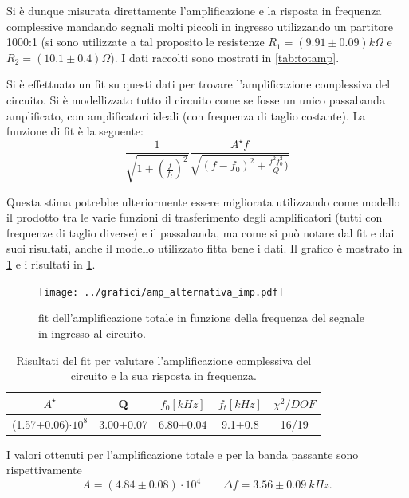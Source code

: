 \documentclass[a4paper,10pt]{article}
\begin{document}
Si è dunque misurata direttamente l'amplificazione e la risposta in frequenza  complessive mandando segnali molti piccoli in ingresso utilizzando un partitore 1000:1 (si sono utilizzate a tal proposito le resistenze $R_1 = (9.91\pm0.09) k\Omega $ e $R_2 = (10.1\pm0.4) \Omega$).
I dati raccolti sono mostrati in \cref{tab:totamp}.

Si è effettuato un fit su questi dati per trovare l'amplificazione complessiva del circuito. Si è modellizzato tutto il circuito come se fosse un unico passabanda amplificato, con amplificatori ideali (con frequenza di taglio costante). La funzione di fit è la seguente:
\begin{equation}
\label{eq:fittot}
\frac{1}{\sqrt{1+(\frac{f}{f_t})^2}} \frac{A^\star f}{\sqrt{(f - f_0)^2+ \frac{f^2 f_0^2}{Q} )}}
\end{equation}

Questa stima potrebbe ulteriormente essere migliorata utilizzando come modello il prodotto tra le varie funzioni di trasferimento degli amplificatori (tutti con frequenze di taglio diverse) e il passabanda, ma come si può notare dal fit e dai suoi risultati, anche il modello utilizzato fitta bene i dati. Il grafico è mostrato in \cref{fig:ampltot} e i risultati in \cref{tab:risult}.

\begin{figure}[H]
	\centering
	\texttt{[image: ../grafici/amp\_alternativa\_imp.pdf]}
	\caption{fit dell'amplificazione totale in funzione della frequenza del segnale in ingresso al circuito.}
	\label{fig:ampltot}
\end{figure}

\begin{table}[H]
	\centering
	\begin{tabular}{c|c|c|c|c}
	$A^\star$ & Q & $f_0[kHz]$ & $f_t[kHz]$ & $\chi^2/DOF$ \\
	\hline
	(1.57$\pm$0.06)$\cdot 10^8$ & 3.00$\pm$0.07 & 6.80$\pm$0.04 & 9.1$\pm$0.8 & 16/19 \\
	\end{tabular}
	\caption{Risultati del fit per valutare l'amplificazione complessiva del circuito e la sua risposta in frequenza.}
	\label{tab:risult}
\end{table}

I valori ottenuti per l'amplificazione totale e per la banda passante sono rispettivamente
\[  A = (4.84\pm0.08)\cdot 10^4 \qquad \Delta f = 3.56\pm0.09~kHz. \]

\end{document}
